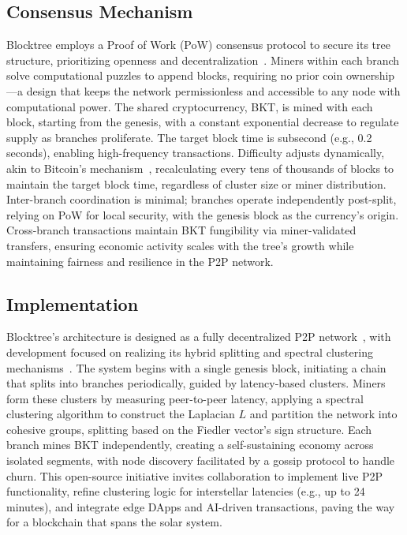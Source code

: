 \subsection{Consensus Mechanism}
Blocktree employs a Proof of Work (PoW) consensus protocol to secure its tree structure, prioritizing openness and decentralization~\cite{nakamoto2008bitcoin}. Miners within each branch solve computational puzzles to append blocks, requiring no prior coin ownership—a design that keeps the network permissionless and accessible to any node with computational power. The shared cryptocurrency, BKT, is mined with each block, starting from the genesis, with a constant exponential decrease to regulate supply as branches proliferate. The target block time is subsecond (e.g., 0.2 seconds), enabling high-frequency transactions. Difficulty adjusts dynamically, akin to Bitcoin’s mechanism~\cite{nakamoto2008bitcoin}, recalculating every tens of thousands of blocks to maintain the target block time, regardless of cluster size or miner distribution. Inter-branch coordination is minimal; branches operate independently post-split, relying on PoW for local security, with the genesis block as the currency’s origin. Cross-branch transactions maintain BKT fungibility via miner-validated transfers, ensuring economic activity scales with the tree’s growth while maintaining fairness and resilience in the P2P network.

\subsection{Implementation}
Blocktree’s architecture is designed as a fully decentralized P2P network~\cite{stoica2001chord}, with development focused on realizing its hybrid splitting and spectral clustering mechanisms~\cite{vonluxburg2007tutorial}. The system begins with a single genesis block, initiating a chain that splits into branches periodically, guided by latency-based clusters. Miners form these clusters by measuring peer-to-peer latency, applying a spectral clustering algorithm to construct the Laplacian $L$ and partition the network into cohesive groups, splitting based on the Fiedler vector’s sign structure. Each branch mines BKT independently, creating a self-sustaining economy across isolated segments, with node discovery facilitated by a gossip protocol to handle churn. This open-source initiative invites collaboration to implement live P2P functionality, refine clustering logic for interstellar latencies (e.g., up to 24 minutes), and integrate edge DApps and AI-driven transactions, paving the way for a blockchain that spans the solar system.